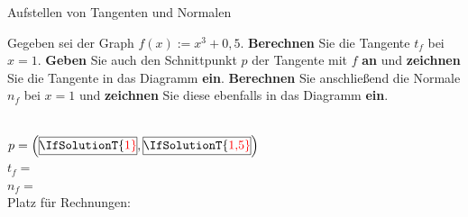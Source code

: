 \documentclass[
    ngerman,
    color=1b,
    load_common,
    leqno,
    boxarc,
    solution=true,
]{rubos-tuda-template}
\begin{document}
\begin{task}[points=5]{Aufstellen von Tangenten und Normalen}
    \def\coordinatesystemradius{4}
    \begin{grayInfoBox}
        Gegeben sei der Graph $f(x):=x^3+0,5$.
        \textbf{Berechnen} Sie die Tangente $t_f$ bei $x=1$.
        \textbf{Geben} Sie auch den Schnittpunkt $p$ der Tangente mit $f$ \textbf{an} und \textbf{zeichnen} Sie die Tangente in das Diagramm \textbf{ein}.
        \textbf{Berechnen} Sie anschließend die Normale $n_f$ bei $x=1$ und \textbf{zeichnen} Sie diese ebenfalls in das Diagramm \textbf{ein}.
    \end{grayInfoBox}
    \begin{minipage}[t]{.5\textwidth}
        \mbox{}\\[1em]
        $p=\left(\tikz[baseline=-.1cm]{\node[inner sep=0pt, minimum width=1cm, minimum height=.5cm, draw]{\IfSolutionT{\color{red}1}};}, \tikz[baseline=-.1cm]{\node[inner sep=0pt, minimum width=1cm, minimum height=.5cm, draw]{\IfSolutionT{\color{red}1,5}};}\right)$\\[2em]
        $t_f=$~
        \dotfill\\[2em]
        $n_f=$~
        \dotfill\\[1em]
        Platz für Rechnungen:
\end{minipage}
\end{task}
\end{document}
